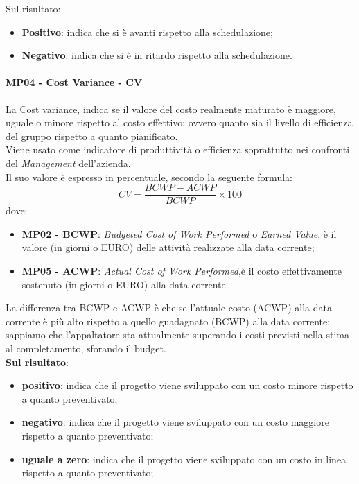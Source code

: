 		Sul risultato:
		\begin{itemize}
		\item {\bfseries Positivo}: indica che si è avanti rispetto alla schedulazione;
		\item {\bfseries Negativo}: indica che si è in ritardo rispetto alla schedulazione.\\
		\end{itemize}
	 \paragraph{MP04 - Cost Variance - CV}
	 La Cost variance, indica se il valore del costo realmente maturato è maggiore, uguale o minore rispetto al costo effettivo; ovvero quanto sia il livello di efficienza del gruppo rispetto a quanto pianificato. \\
	 Viene usato come indicatore di produttività o efficienza soprattutto nei confronti del {\itshape Management} dell'azienda. \\
	 Il suo valore è espresso in percentuale, secondo la seguente formula:
	 \begin{displaymath}
	 	CV = \frac{BCWP - ACWP}{BCWP}\times100
	 \end{displaymath}
 		dove:
 		\begin{itemize}
 			\item {\bfseries MP02 - BCWP}: {\itshape Budgeted Cost of Work Performed} o {\itshape
 				Earned Value}, è il valore (in giorni o EURO) delle attività realizzate alla data corrente;
 			\item {\bfseries MP05 - ACWP}: {\itshape Actual Cost of Work Performed},è il costo effettivamente sostenuto (in giorni o EURO) alla data corrente.
 		\end{itemize}
 		La differenza tra BCWP e ACWP è che se l'attuale costo (ACWP) alla data corrente è più alto rispetto a quello guadagnato (BCWP) alla data corrente; sappiamo che l'appaltatore sta attualmente superando i costi previsti nella stima al completamento, sforando il budget.	\\

 		{\bfseries Sul risultato}:
 		\begin{itemize}
 			\item {\bfseries positivo}: indica che il progetto viene sviluppato con un costo minore rispetto a quanto preventivato;
 			\item {\bfseries negativo}:  indica che il progetto viene sviluppato con un costo maggiore rispetto a quanto preventivato;
 			\item {\bfseries uguale a zero}: indica che il progetto viene sviluppato con un costo in linea rispetto a quanto preventivato;\\
 		\end{itemize}

